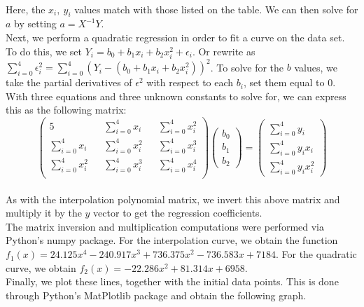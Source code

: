 \documentclass[12pt]{article}
\begin{document}
\\Here, the $x_i,~y_i$ values match with those listed on the table. We can then solve for $a$ by setting $a = X^{-1}Y$. 
\\Next, we perform a quadratic regression in order to fit a curve on the data set. To do this, we set $Y_i = b_0 + b_1 x_i + b_2 x_i^2+\epsilon_i$. Or rewrite as $\sum_{i = 0}^{4}\epsilon_i^2=\sum_{i = 0}^{4}(Y_i - (b_0 + b_1 x_i + b_2 x_i^2))^2$.
To solve for the $b$ values, we take the partial derivatives of $\epsilon^2$ with respect to each $b_i$, set them equal to 0. With three equations and three unknown constants to solve for, we can express this as the following matrix:
$$\begin{pmatrix}
5&&\sum_{i=0}^{4}x_i&&\sum_{i=0}^{4}x_i^2\\
\sum_{i=0}^{4}x_i&&\sum_{i=0}^{4}x_i^2&&\sum_{i=0}^{4}x_i^3\\
\sum_{i=0}^{4}x_i^2&&\sum_{i=0}^{4}x_i^3&&\sum_{i=0}^{4}x_i^4\\
\end{pmatrix}
\begin{pmatrix}
b_0\\b_1\\b_2
\end{pmatrix}
=\begin{pmatrix}
\sum_{i=0}^{4}y_i\\\sum_{i=0}^{4}y_ix_i\\\sum_{i=0}^{4}y_ix_i^2
\end{pmatrix}$$
\\As with the interpolation polynomial matrix, we invert this above matrix and multiply it by the $y$ vector to get the regression coefficients. 
\\The matrix inversion and multiplication computations were performed via Python's numpy package. For the interpolation curve, we obtain the function $f_1(x) = 24.125x^4-240.917x^3+736.375x^2 -736.583x+7184$.
For the quadratic curve, we obtain $f_2(x)=-22.286x^2 + 81.314x + 6958$.
\\Finally, we plot these lines, together with the initial data points. This is done through Python's MatPlotlib package and obtain the following graph.
\end{document}
